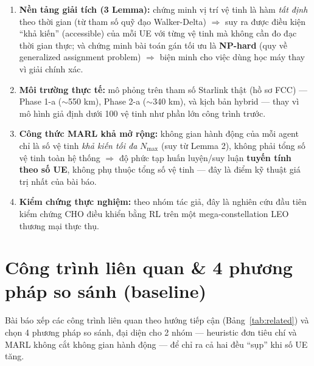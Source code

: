 \documentclass[12pt,a4paper]{article}
\begin{document}
\begin{enumerate}[leftmargin=1.3em]
  \item \textbf{Nền tảng giải tích (3 Lemma):} chứng minh vị trí vệ tinh là hàm \emph{tất
        định} theo thời gian (từ tham số quỹ đạo Walker-Delta) $\Rightarrow$ suy ra được điều
        kiện ``khả kiến'' (accessible) của mỗi UE với từng vệ tinh mà không cần đo đạc thời
        gian thực; và chứng minh bài toán gán tối ưu là \textbf{NP-hard} (quy về generalized
        assignment problem) $\Rightarrow$ biện minh cho việc dùng học máy thay vì giải chính
        xác.
  \item \textbf{Môi trường thực tế:} mô phỏng trên tham số Starlink thật (hồ sơ FCC) — Phase
        1-a ($\sim$550 km), Phase 2-a ($\sim$340 km), và kịch bản hybrid — thay vì mô hình giả
        định dưới 100 vệ tinh như phần lớn công trình trước.
  \item \textbf{Công thức MARL khả mở rộng:} không gian hành động của mỗi agent chỉ là số vệ
        tinh \emph{khả kiến tối đa} $N_{\max}$ (suy từ Lemma 2), không phải tổng số vệ tinh
        toàn hệ thống $\Rightarrow$ độ phức tạp huấn luyện/suy luận \textbf{tuyến tính theo số
        UE}, không phụ thuộc tổng số vệ tinh — đây là điểm kỹ thuật giá trị nhất của bài báo.
  \item \textbf{Kiểm chứng thực nghiệm:} theo nhóm tác giả, đây là nghiên cứu đầu tiên kiểm
        chứng CHO điều khiển bằng RL trên một mega-constellation LEO thương mại thực thụ.
\end{enumerate}

\section{Công trình liên quan \& 4 phương pháp so sánh (baseline)}

Bài báo xếp các công trình liên quan theo hướng tiếp cận (Bảng~\ref{tab:related}) và chọn 4
phương pháp so sánh, đại diện cho 2 nhóm — heuristic đơn tiêu chí và MARL không cắt không
gian hành động — để chỉ ra cả hai đều ``sụp'' khi số UE tăng.
\end{document}
